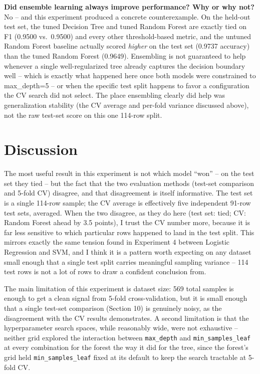 \documentclass[11pt,a4paper]{article}
\begin{document}
\textbf{Did ensemble learning always improve performance? Why or why not?}\\
No -- and this experiment produced a concrete counterexample. On the held-out test set, the tuned Decision Tree and tuned Random Forest are exactly tied on F1 (0.9500 vs.\ 0.9500) and every other threshold-based metric, and the untuned Random Forest baseline actually scored \emph{higher} on the test set (0.9737 accuracy) than the tuned Random Forest (0.9649). Ensembling is not guaranteed to help whenever a single well-regularized tree already captures the decision boundary well -- which is exactly what happened here once both models were constrained to max\_depth=5 -- or when the specific test split happens to favor a configuration the CV search did not select. The place ensembling clearly did help was generalization stability (the CV average and per-fold variance discussed above), not the raw test-set score on this one 114-row split.

\section{Discussion}
The most useful result in this experiment is not which model ``won'' -- on the test set they tied -- but the fact that the two evaluation methods (test-set comparison and 5-fold CV) disagree, and that disagreement is itself informative. The test set is a single 114-row sample; the CV average is effectively five independent 91-row test sets, averaged. When the two disagree, as they do here (test set: tied; CV: Random Forest ahead by 3.5 points), I trust the CV number more, because it is far less sensitive to which particular rows happened to land in the test split. This mirrors exactly the same tension found in Experiment 4 between Logistic Regression and SVM, and I think it is a pattern worth expecting on any dataset small enough that a single test split carries meaningful sampling variance -- 114 test rows is not a lot of rows to draw a confident conclusion from.

The main limitation of this experiment is dataset size: 569 total samples is enough to get a clean signal from 5-fold cross-validation, but it is small enough that a single test-set comparison (Section 10) is genuinely noisy, as the disagreement with the CV results demonstrates. A second limitation is that the hyperparameter search spaces, while reasonably wide, were not exhaustive -- neither grid explored the interaction between \texttt{max\_depth} and \texttt{min\_samples\_leaf} at every combination for the forest the way it did for the tree, since the forest's grid held \texttt{min\_samples\_leaf} fixed at its default to keep the search tractable at 5-fold CV.
\end{document}
